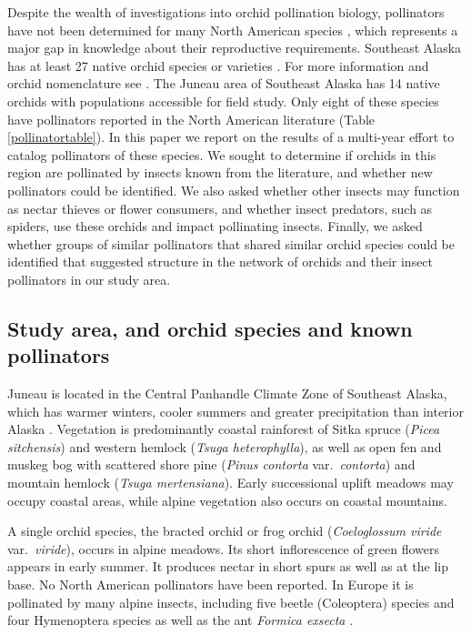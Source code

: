 \begin{multicols}{2}
Despite the wealth of investigations into orchid pollination biology,
pollinators have not been determined for many North American species
\citep{Argue2012a, Argue2012b}, which represents a major gap in knowledge about their
reproductive requirements. Southeast Alaska has at least 27 native
orchid species or varieties \citep[e.g.,][]{Hulten1968, Brown2006}. For more
information and orchid nomenclature see \citet{BowlesArmstrong2019}. The
Juneau area of Southeast Alaska has 14 native orchids with populations
accessible for field study. Only eight of these species have pollinators
reported in the North American literature (Table \ref{pollinatortable}). In this paper we
report on the results of a multi-year effort to catalog pollinators of
these species. We sought to determine if orchids in this region are
pollinated by insects known from the literature, and whether new
pollinators could be identified. We also asked whether other insects may
function as nectar thieves or flower consumers, and whether insect
predators, such as spiders, use these orchids and impact pollinating
insects. Finally, we asked whether groups of similar pollinators that
shared similar orchid species could be identified that suggested
structure in the network of orchids and their insect pollinators in our
study area.

\subsection{Study area, and orchid species and known pollinators}

Juneau is located in the Central Panhandle Climate Zone of Southeast
Alaska, which has warmer winters, cooler summers and greater
precipitation than interior Alaska \citep{Bienieketal2012}. Vegetation is
predominantly coastal rainforest of Sitka spruce (\emph{Picea
sitchensis}) and western hemlock (\emph{Tsuga heterophylla}), as well as
open fen and muskeg bog with scattered shore pine (\emph{Pinus contorta}
var.\ \emph{contorta}) and mountain hemlock (\emph{Tsuga mertensiana}).
Early successional uplift meadows may occupy coastal areas, while alpine
vegetation also occurs on coastal mountains.

A single orchid species, the bracted orchid or frog orchid
(\emph{Coeloglossum viride} var.\ \emph{viride}), occurs in alpine
meadows. Its short inflorescence of green flowers appears in early
summer. It produces nectar in short spurs as well as at the lip base. No
North American pollinators have been reported. In Europe it is
pollinated by many alpine insects, including five beetle (Coleoptera)
species and four Hymenoptera species as well as the ant \emph{Formica
exsecta} \citep{ClaessensSeiffert2017}.


\end{multicols}
